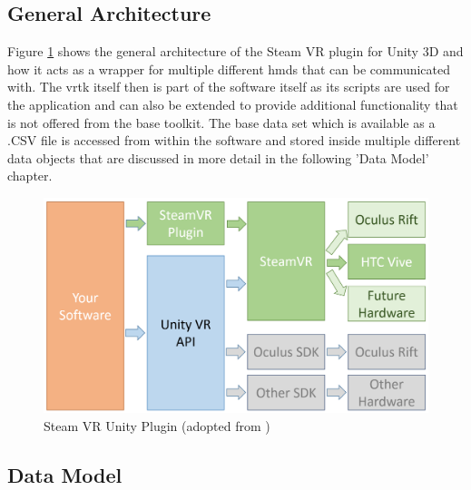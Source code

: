 \subsection{General Architecture}

Figure \ref{fig:steamvrselected} shows the general architecture of the Steam VR plugin for Unity 3D and how it acts as a wrapper for multiple different \glspl{hmd} that can be communicated with. The \gls{vrtk} itself then is part of the software itself as its scripts are used for the application and can also be extended to provide additional functionality that is not offered from the base toolkit. The base data set which is available as a .CSV file is accessed from within the software and stored inside multiple different data objects that are discussed in more detail in the following 'Data Model' chapter.

\begin{figure}[h]
	\begin{center}
		\includegraphics[width=14cm]{03_Figures/04_Valve/OpenVR_SteamVR_selected.png}
		\caption[Steam VR Unity Plugin]{Steam VR Unity Plugin (adopted from \cite{Valve2016})}
		\label{fig:steamvrselected}
	\end{center}
\end{figure}




\subsection{Data Model}

